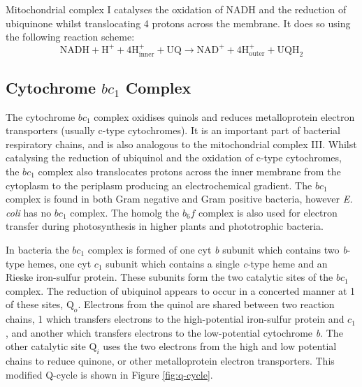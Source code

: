 Mitochondrial complex I catalyses the oxidation of NADH and the reduction of ubiquinone whilst translocating 4 protons across the membrane. It does so using the following reaction scheme:
\begin{equation}
\mathrm{NADH} + \mathrm{H}^+ + 4\mathrm{H}^+_{\mathrm{inner}} + \mathrm{UQ} \rightarrow \mathrm{NAD}^+ + 4\mathrm{H}^+_{\mathrm{outer}} + \mathrm{UQH}_2
\end{equation}

\subsection{\texorpdfstring{Cytochrome $bc_\mathrm{1}$ Complex}{Cytochrome bc1 Complex}}
The cytochrome $bc_\mathrm{1}$ complex oxidises quinols and reduces metalloprotein electron transporters (usually c-type cytochromes). It is an important part of bacterial respiratory chains, and is also analogous to the mitochondrial complex III\cite{Thoeny-Meyer1997}. Whilst catalysing the reduction of ubiquinol and the oxidation of c-type cytochromes, the $bc_\mathrm{1}$ complex also translocates protons across the inner membrane from the cytoplasm to the periplasm producing an electrochemical gradient. The $bc_\mathrm{1}$ complex is found in both Gram negative and Gram positive bacteria, however \textit{E. coli} has no $bc_\mathrm{1}$ complex. The homolg the $b_6f$ complex is also used for electron transfer during photosynthesis in higher plants and phototrophic bacteria\cite{Darrouzet1999}.

In bacteria the $bc_1$ complex is formed of one cyt \textit{b} subunit which contains two \textit{b}-type hemes, one cyt $c_1$ subunit which contains a single \textit{c}-type heme and an Rieske iron-sulfur protein. These subunits form the two catalytic sites of the $bc_1$ complex. The reduction of ubiquinol appears to occur in a concerted manner at 1 of these sites, $\mathrm{Q}_o$\cite{Darrouzet1999}. Electrons from the quinol are shared between two reaction chains, 1 which transfers electrons to the high-potential iron-sulfur protein and $c_1$, and another which transfers electrons to the low-potential cytochrome \textit{b}. The other catalytic site $\mathrm{Q}_i$ uses the two electrons from the high and low potential chains to reduce quinone, or other metalloprotein electron transporters\cite{Snyder2000,Berry2011}. This modified Q-cycle is shown in Figure \ref{fig:q-cycle}.

